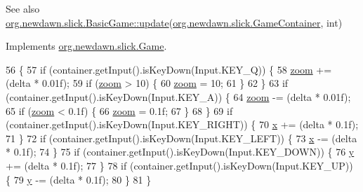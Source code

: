 \begin{DoxySeeAlso}{See also}
\mbox{\hyperlink{classorg_1_1newdawn_1_1slick_1_1_basic_game_acfe6fa05aef83bff1631af91a3e4bd20}{org.\+newdawn.\+slick.\+Basic\+Game\+::update}}(\mbox{\hyperlink{classorg_1_1newdawn_1_1slick_1_1_game_container}{org.\+newdawn.\+slick.\+Game\+Container}}, int) 
\end{DoxySeeAlso}


Implements \mbox{\hyperlink{interfaceorg_1_1newdawn_1_1slick_1_1_game_ab07b2e9463ee4631620dde0de25bdee8}{org.\+newdawn.\+slick.\+Game}}.


\begin{DoxyCode}
56                                                                                  \{
57         \textcolor{keywordflow}{if} (container.getInput().isKeyDown(Input.KEY\_Q)) \{
58             \mbox{\hyperlink{classorg_1_1newdawn_1_1slick_1_1tests_1_1_inkscape_test_ab12f97286b8d91a4a34120db6c223d73}{zoom}} += (delta * 0.01f);
59             \textcolor{keywordflow}{if} (\mbox{\hyperlink{classorg_1_1newdawn_1_1slick_1_1tests_1_1_inkscape_test_ab12f97286b8d91a4a34120db6c223d73}{zoom}} > 10) \{
60                 \mbox{\hyperlink{classorg_1_1newdawn_1_1slick_1_1tests_1_1_inkscape_test_ab12f97286b8d91a4a34120db6c223d73}{zoom}} = 10;
61             \}
62         \}
63         \textcolor{keywordflow}{if} (container.getInput().isKeyDown(Input.KEY\_A)) \{
64             \mbox{\hyperlink{classorg_1_1newdawn_1_1slick_1_1tests_1_1_inkscape_test_ab12f97286b8d91a4a34120db6c223d73}{zoom}} -= (delta * 0.01f);
65             \textcolor{keywordflow}{if} (\mbox{\hyperlink{classorg_1_1newdawn_1_1slick_1_1tests_1_1_inkscape_test_ab12f97286b8d91a4a34120db6c223d73}{zoom}} < 0.1f) \{
66                 \mbox{\hyperlink{classorg_1_1newdawn_1_1slick_1_1tests_1_1_inkscape_test_ab12f97286b8d91a4a34120db6c223d73}{zoom}} = 0.1f;
67             \}
68         \}
69         \textcolor{keywordflow}{if} (container.getInput().isKeyDown(Input.KEY\_RIGHT)) \{
70             \mbox{\hyperlink{classorg_1_1newdawn_1_1slick_1_1tests_1_1_inkscape_test_ac1c5e9cb77532a2ac45acb0463eff275}{x}} += (delta * 0.1f);
71         \}
72         \textcolor{keywordflow}{if} (container.getInput().isKeyDown(Input.KEY\_LEFT)) \{
73             \mbox{\hyperlink{classorg_1_1newdawn_1_1slick_1_1tests_1_1_inkscape_test_ac1c5e9cb77532a2ac45acb0463eff275}{x}} -= (delta * 0.1f);
74         \}
75         \textcolor{keywordflow}{if} (container.getInput().isKeyDown(Input.KEY\_DOWN)) \{
76             \mbox{\hyperlink{classorg_1_1newdawn_1_1slick_1_1tests_1_1_inkscape_test_a33b17405f7d73dabfaa62122e2a042c8}{y}} += (delta * 0.1f);
77         \}
78         \textcolor{keywordflow}{if} (container.getInput().isKeyDown(Input.KEY\_UP)) \{
79             \mbox{\hyperlink{classorg_1_1newdawn_1_1slick_1_1tests_1_1_inkscape_test_a33b17405f7d73dabfaa62122e2a042c8}{y}} -= (delta * 0.1f);
80         \}
81     \}
\end{DoxyCode}


